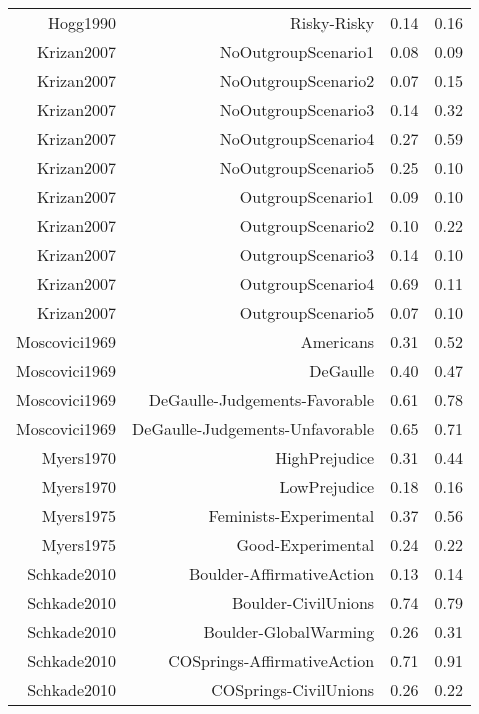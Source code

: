 \begin{longtable}{rrcc}
Hogg1990 & Risky-Risky & 0.14 & 0.16\\
\addlinespace
Krizan2007 & NoOutgroupScenario1 & 0.08 & 0.09\\
Krizan2007 & NoOutgroupScenario2 & 0.07 & 0.15\\
Krizan2007 & NoOutgroupScenario3 & 0.14 & 0.32\\
Krizan2007 & NoOutgroupScenario4 & 0.27 & 0.59\\
Krizan2007 & NoOutgroupScenario5 & 0.25 & 0.10\\
Krizan2007 & OutgroupScenario1 & 0.09 & 0.10\\
Krizan2007 & OutgroupScenario2 & 0.10 & 0.22\\
Krizan2007 & OutgroupScenario3 & 0.14 & 0.10\\
Krizan2007 & OutgroupScenario4 & 0.69 & 0.11\\
Krizan2007 & OutgroupScenario5 & 0.07 & 0.10\\
\addlinespace
Moscovici1969 & Americans & 0.31 & 0.52\\
Moscovici1969 & DeGaulle & 0.40 & 0.47\\
Moscovici1969 & DeGaulle-Judgements-Favorable & 0.61 & 0.78\\
Moscovici1969 & DeGaulle-Judgements-Unfavorable & 0.65 & 0.71\\
\addlinespace
Myers1970 & HighPrejudice & 0.31 & 0.44\\
Myers1970 & LowPrejudice & 0.18 & 0.16\\
\addlinespace
Myers1975 & Feminists-Experimental & 0.37 & 0.56\\
Myers1975 & Good-Experimental & 0.24 & 0.22\\
\addlinespace
Schkade2010 & Boulder-AffirmativeAction & 0.13 & 0.14\\
Schkade2010 & Boulder-CivilUnions & 0.74 & 0.79\\
Schkade2010 & Boulder-GlobalWarming & 0.26 & 0.31\\
Schkade2010 & COSprings-AffirmativeAction & 0.71 & 0.91\\
Schkade2010 & COSprings-CivilUnions & 0.26 & 0.22\\*
\bottomrule
\end{longtable}
